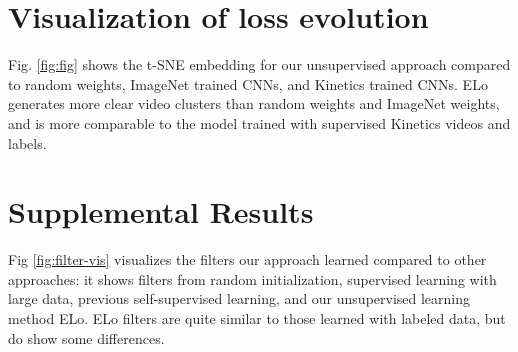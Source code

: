 \documentclass[10pt,twocolumn,letterpaper]{article}
\begin{document}
\section{Visualization of loss evolution}
Fig. \ref{fig:fig} shows the t-SNE embedding for our unsupervised approach compared to random weights, ImageNet trained CNNs, and Kinetics trained CNNs. ELo  generates more clear video clusters than random weights and ImageNet weights, and is more comparable to the model trained with supervised Kinetics videos and labels.



\section{Supplemental Results}






Fig \ref{fig:filter-vis} visualizes the filters our approach learned compared to other approaches: it shows filters from random initialization, supervised learning with large data, previous self-supervised learning, and our unsupervised learning method ELo. ELo filters are quite similar to those learned with labeled data, but do show some differences.
\end{document}
